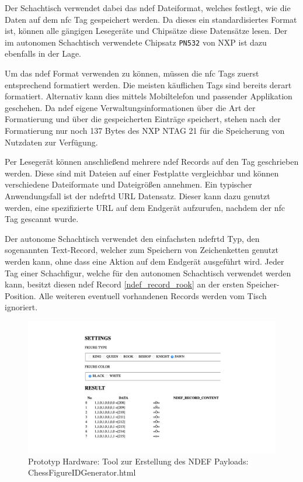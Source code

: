 Der Schachtisch verwendet dabei das \gls{ndef} Dateiformat, welches
festlegt, wie die Daten auf dem \gls{nfc} Tag gespeichert werden. Da
dieses ein standardisiertes Format ist, können alle gängigen Lesegeräte
und Chipsätze diese Datensätze lesen. Der im autonomen Schachtisch
verwendete Chipsatz \passthrough{\lstinline!PN532!} von NXP ist dazu
ebenfalls in der Lage.

Um das \gls{ndef} Format verwenden zu können, müssen die \gls{nfc} Tags
zuerst entsprechend formatiert werden. Die meisten käuflichen Tags sind
bereits derart formatiert. Alternativ kann dies mittels Mobiltelefon und
passender Applikation geschehen. Da \gls{ndef} eigene
Verwaltungsinformationen über die Art der Formatierung und über die
gespeicherten Einträge speichert, stehen nach der Formatierung nur noch
137 Bytes des NXP NTAG 21 für die Speicherung von Nutzdaten zur
Verfügung.

Per Lesegerät können anschließend mehrere \gls{ndef} Records auf den Tag
geschrieben werden. Diese sind mit Dateien auf einer Festplatte
vergleichbar und können verschiedene Dateiformate und Dateigrößen
annehmen. Ein typischer Anwendungsfall ist der \gls{ndefrtd} URL
Datensatz. Dieser kann dazu genutzt werden, eine spezifizierte URL auf
dem Endgerät aufzurufen, nachdem der \gls{nfc} Tag gescannt wurde.
\cite{nordicnfclibndef}

Der autonome Schachtisch verwendet den einfachsten \gls{ndefrtd} Typ,
den sogenannten Text-Record, welcher zum Speichern von Zeichenketten
genutzt werden kann, ohne dass eine Aktion auf dem Endgerät ausgeführt
wird. Jeder Tag einer Schachfigur, welche für den autonomen Schachtisch
verwendet werden kann, besitzt diesen \gls{ndef} Record
\ref{ndef_record_rook} an der ersten Speicher-Position. Alle weiteren
eventuell vorhandenen Records werden vom Tisch ignoriert.
\cite{nordicnfclib}

\begin{figure}
\centering
\includegraphics{images/ATC_ChessFigureIDGenerator.png}
\caption{Prototyp Hardware: Tool zur Erstellung des NDEF Payloads:
ChessFigureIDGenerator.html \label{ATC_ChessFigureIDGenerator}}
\end{figure}

